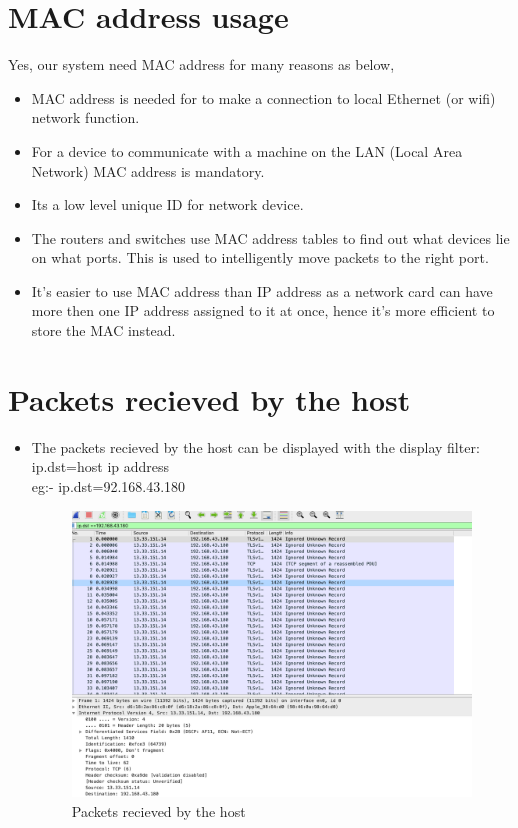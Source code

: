 \section{MAC address usage}
 Yes, our system need MAC address for many reasons as below,
\begin{itemize}

\item MAC address is needed for to make a connection to local Ethernet (or wifi) network function. 
\item For a device to communicate with a machine on the LAN (Local Area Network) MAC address is mandatory.
\item Its a low level unique ID for network device.
\item The routers and switches use MAC address tables to find out what devices lie on what ports. This is used to intelligently move packets to the right port. 
\item It’s easier to use MAC address than IP address as a network card can have more then one IP address assigned to it at once, hence it’s more efficient to store the MAC instead.

\end{itemize}

\section{Packets recieved by the host}
\begin{itemize}
\item The packets recieved by the host can be displayed with the display filter: ip.dst=host ip address
\\eg:- ip.dst=92.168.43.180
\begin{figure}[H]
\centering
  \includegraphics[width=400pt]{Images/ip dst.png}
  \caption{Packets recieved by the host}
  \label{fig:2.6}
\end{figure}
\end{itemize}
